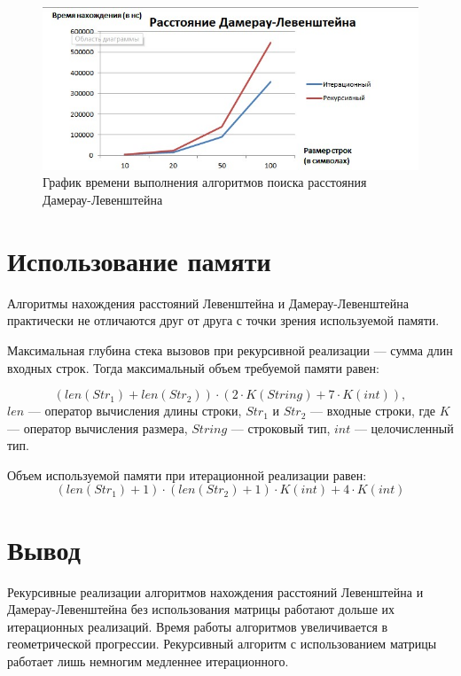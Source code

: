 \documentclass[12pt]{report}
\begin{document}
    \begin{figure}[H]
        \centering
        \includegraphics[scale=0.75]{img/levDamGraphic}
        \caption{График времени выполнения алгоритмов поиска расстояния Дамерау-Левенштейна}
        \label{fig:levDamGraphic}
    \end{figure}


    \section{Использование памяти}
    Алгоритмы нахождения расстояний Левенштейна и Дамерау-Левенштейна практически
    не отличаются друг от друга с точки зрения используемой памяти.

    Максимальная глубина стека вызовов при рекурсивной реализации --- сумма длин входных строк.
    Тогда максимальный объем требуемой памяти равен:

    \begin{equation}
        (len(Str_{1}) + len(Str_{2})) \cdot
        (2 \cdot K(String) + 7 \cdot K(int)),
    \end{equation}
    $len$ --- оператор вычисления длины строки,
    $Str_{1}$ и $Str_{2}$ --- входные строки,
    где $K$ --- оператор вычисления размера,
    $String$ --- строковый тип, $int$ --- целочисленный тип.

    Объем используемой памяти при итерационной реализации равен:
    \begin{equation}
        (len(Str_{1}) + 1) \cdot (len(Str_{2}) + 1) \cdot K(int) +
        4 \cdot K(int)
    \end{equation}


    \section{Вывод}
    Рекурсивные реализации алгоритмов нахождения расстояний Левенштейна и Дамерау-Левенштейна
    без использования матрицы работают дольше их итерационных реализаций.
    Время работы алгоритмов увеличивается в геометрической прогрессии.
    Рекурсивный алгоритм с использованием матрицы работает лишь немногим медленнее итерационного.
\end{document}
